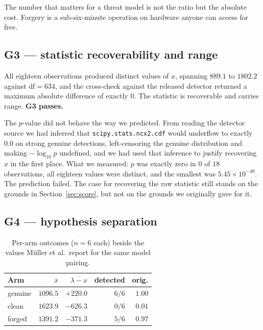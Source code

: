 \documentclass[10pt,twocolumn]{article}
\newcommand{\code}[1]{\texttt{\small #1}}
\newcommand{\xstat}{\ensuremath{x}}
\newcommand{\lam}{\ensuremath{\lambda}}
\begin{document}
The number that matters for a threat model is not the ratio but the absolute cost.
Forgery is a sub-six-minute operation on hardware anyone can access for free.

\subsection{G3 --- statistic recoverability and range}

All eighteen observations produced distinct values of $\xstat$, spanning $889.1$ to
$1802.2$ against $\mathrm{df} = 634$, and the cross-check against the released
detector returned a maximum absolute difference of exactly $0$. The statistic is
recoverable and carries range. \textbf{G3 passes.}

The $p$-value did not behave the way we predicted. From reading the detector source we
had inferred that \code{scipy.stats.ncx2.cdf} would underflow to exactly $0.0$ on
strong genuine detections, left-censoring the genuine distribution and making
$-\log_{10} p$ undefined, and we had used that inference to justify recovering
$\xstat$ in the first place. What we measured: $p$ was exactly zero in $0$ of $18$
observations, all eighteen values were distinct, and the smallest was
$5.45 \times 10^{-49}$. The prediction failed. The case for recovering the raw
statistic still stands on the grounds in Section~\ref{sec:score}, but not on the
grounds we originally gave for it.

\subsection{G4 --- hypothesis separation}

\begin{table}[t]
\centering\small
\caption{Per-arm outcomes ($n = 6$ each) beside the values M\"uller et al.\ report for
the same model pairing.}
\label{tab:arms}
\begin{tabular}{lrrrr}
\toprule
Arm & $\bar{\xstat}$ & $\overline{\lam - \xstat}$ & detected & orig. \\
\midrule
genuine & $1096.5$ & $+220.0$ & $6/6$ & $1.00$ \\
clean   & $1623.9$ & $-626.3$ & $0/6$ & $0.01$ \\
forged  & $1391.2$ & $-371.3$ & $5/6$ & $0.97$ \\
\bottomrule
\end{tabular}
\end{table}
\end{document}
